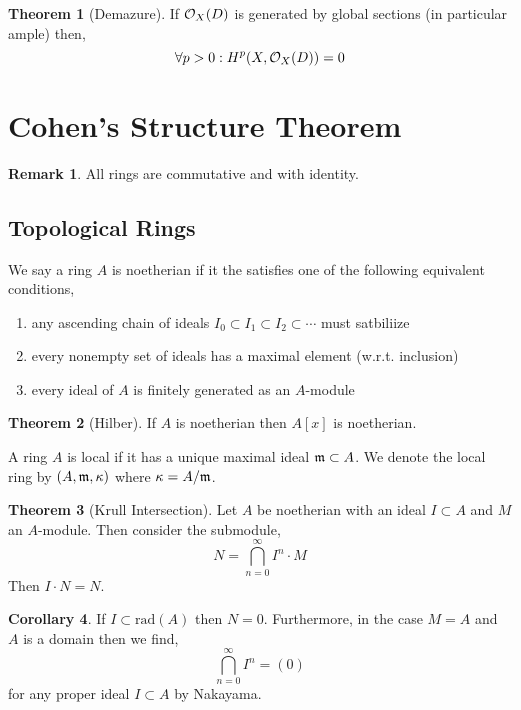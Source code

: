\documentclass[12pt]{extarticle}
\theoremstyle{definition}
\newtheorem{theorem}{Theorem}[section]
\newtheorem{corollary}[theorem]{Corollary}
\newtheorem{remark}{Remark}
\newenvironment{definition}[1][Definition:]{\begin{trivlist}
\item[\hskip \labelsep {\bfseries #1}]}{\end{trivlist}}
\begin{document}
\begin{theorem}[Demazure]
If $\mathcal{O}_{X}(D)$ is generated by global sections (in particular ample) then,
\[ \forall p > 0 : H^p(X, \mathcal{O}_{X}(D)) = 0 \]
\end{theorem}

\section{Cohen's Structure Theorem}

\begin{remark}
All rings are commutative and with identity.
\end{remark}

\subsection{Topological Rings}

\begin{definition}
We say a ring $A$ is noetherian if it the satisfies one of the following equivalent conditions,
\begin{enumerate}
\item any ascending chain of ideals $I_0 \subset I_1 \subset I_2 \subset \cdots $ must satbiliize
\item every nonempty set of ideals has a maximal element (w.r.t. inclusion)
\item every ideal of $A$ is finitely generated as an $A$-module
\end{enumerate}
\end{definition}

\begin{theorem}[Hilber]
If $A$ is noetherian then $A[x]$ is noetherian. 
\end{theorem}

\begin{definition}
A ring $A$ is local if it has a unique maximal ideal $\mathfrak{m} \subset A$. We denote the local ring by $(A, \mathfrak{m}, \kappa)$ where $\kappa = A / \mathfrak{m}$. 
\end{definition}

\begin{theorem}[Krull Intersection]
Let $A$ be noetherian with an ideal $I \subset A$ and $M$ an $A$-module. Then consider the submodule,
\[ N =  \bigcap_{n = 0}^\infty I^n \cdot M \]
Then $I \cdot N = N$. 
\end{theorem}

\begin{corollary}
If $I \subset \mathrm{rad}(A)$ then $N = 0$. Furthermore, in the case $M = A$ and $A$ is a domain then we find,
\[ \bigcap_{n = 0}^\infty I^n = (0) \]
for any proper ideal $I \subset A$ by Nakayama. 
\end{corollary}
\end{document}
